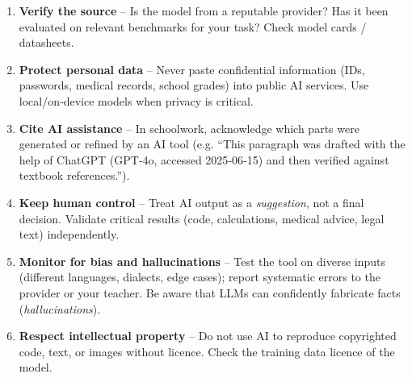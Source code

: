 \documentclass[11pt]{article}
\begin{document}
\begin{methode}
\begin{enumerate}
\item \textbf{Verify the source} – Is the model from a reputable provider? Has it been evaluated on relevant benchmarks for your task? Check model cards / datasheets.
\item \textbf{Protect personal data} – Never paste confidential information (IDs, passwords, medical records, school grades) into public AI services. Use local/on‑device models when privacy is critical.
\item \textbf{Cite AI assistance} – In schoolwork, acknowledge which parts were generated or refined by an AI tool (e.g. “This paragraph was drafted with the help of ChatGPT (GPT‑4o, accessed 2025‑06‑15) and then verified against textbook references.”).
\item \textbf{Keep human control} – Treat AI output as a \emph{suggestion}, not a final decision. Validate critical results (code, calculations, medical advice, legal text) independently.
\item \textbf{Monitor for bias and hallucinations} – Test the tool on diverse inputs (different languages, dialects, edge cases); report systematic errors to the provider or your teacher. Be aware that LLMs can confidently fabricate facts (\emph{hallucinations}).
\item \textbf{Respect intellectual property} – Do not use AI to reproduce copyrighted code, text, or images without licence. Check the training data licence of the model.
\end{enumerate}
\end{methode}
\end{document}
